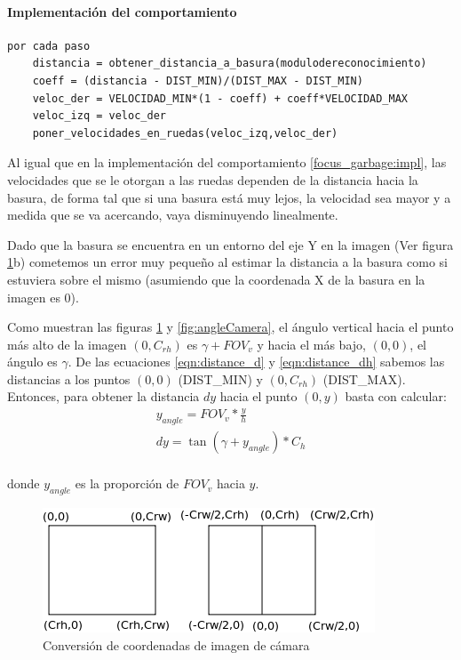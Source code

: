 \paragraph{Implementaci\'on del comportamiento}
\label{go_to_garbage:impl}
\begin{verbatim}
por cada paso
    distancia = obtener_distancia_a_basura(modulodereconocimiento)
    coeff = (distancia - DIST_MIN)/(DIST_MAX - DIST_MIN)
    veloc_der = VELOCIDAD_MIN*(1 - coeff) + coeff*VELOCIDAD_MAX
    veloc_izq = veloc_der
    poner_velocidades_en_ruedas(veloc_izq,veloc_der)
\end{verbatim}

Al igual que en la implementaci\'on del comportamiento \ref{focus_garbage:impl},
las velocidades que se le otorgan a las ruedas dependen de la distancia
hacia la basura, de forma tal que si una basura est\'a muy lejos, la velocidad
sea mayor y a medida que se va acercando, vaya disminuyendo linealmente.

Dado que la basura se encuentra en un entorno del eje Y en la imagen (Ver figura
\ref{fig:image_coord_conv}b) cometemos un error muy peque\~no al estimar la distancia
a la basura como si estuviera sobre el mismo (asumiendo que la coordenada X de la
basura en la imagen es 0).

Como muestran las figuras \ref{fig:image_coord_conv} y \ref{fig:angleCamera},
el \'angulo vertical hacia el punto m\'as alto de la imagen $(0,C_{rh})$ es 
$\gamma+FOV_v$ y hacia el m\'as bajo, $(0,0)$, el \'angulo es $\gamma$.
De las ecuaciones \eqref{eqn:distance_d} y \eqref{eqn:distance_dh} sabemos
las distancias a los puntos $(0,0)$ (DIST\_MIN) y $(0,C_{rh})$ (DIST\_MAX). 
Entonces, para obtener la distancia $dy$ hacia el punto $(0,y)$ basta con
calcular:
\begin{eqnarray}
y_{angle} = FOV_v * \frac{y}{h} \\
dy = \tan(\gamma + y_{angle}) * C_h \\
\end{eqnarray}

donde $y_{angle}$ es la proporci\'on de $FOV_v$ hacia $y$.
\begin{figure}[htp]
\begin{center}
\includegraphics[scale=0.5]{comportamientos/imageCoordsConvertion.png}
\caption{Conversi\'on de coordenadas de imagen de c\'amara}
\label{fig:image_coord_conv}
\end{center}
\end{figure}

